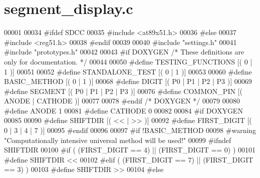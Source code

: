 \section{segment\_\-display.c}

\begin{DoxyCode}
00001 
00034 \textcolor{preprocessor}{#ifdef SDCC}
00035 \textcolor{preprocessor}{}\textcolor{preprocessor}{#include <at89x51.h>}
00036 \textcolor{preprocessor}{#else}
00037 \textcolor{preprocessor}{}\textcolor{preprocessor}{#include <reg51.h>}
00038 \textcolor{preprocessor}{#endif}
00039 \textcolor{preprocessor}{}
00040 \textcolor{preprocessor}{#include "settings.h"}
00041 \textcolor{preprocessor}{#include "prototypes.h"}
00042 
00043 \textcolor{preprocessor}{#if DOXYGEN }\textcolor{comment}{/* These definitions are only for documentation. */}
00044 
00050 \textcolor{preprocessor}{#define TESTING\_FUNCTIONS       [( 0 | 1 )]}
00051 \textcolor{preprocessor}{}
00052 \textcolor{preprocessor}{#define STANDALONE\_TEST         [( 0 | 1 )]}
00053 \textcolor{preprocessor}{}
00060 \textcolor{preprocessor}{#define BASIC\_METHOD            [( 0 | 1 )] }
00068 \textcolor{preprocessor}{#define DIGIT [( P0 | P1 | P2 | P3 )] }
00069 \textcolor{preprocessor}{#define SEGMENT [( P0 | P1 | P2 | P3 )] }
00076 \textcolor{preprocessor}{#define COMMON\_PIN [( ANODE | CATHODE )]}
00077 \textcolor{preprocessor}{}
00078 \textcolor{preprocessor}{#endif }\textcolor{comment}{/* DOXYGEN */}
00079 
00080 \textcolor{preprocessor}{#define ANODE 1}
00081 \textcolor{preprocessor}{}\textcolor{preprocessor}{#define CATHODE 0}
00082 \textcolor{preprocessor}{}
00084 \textcolor{preprocessor}{#if DOXYGEN}
00085 \textcolor{preprocessor}{}
00090 \textcolor{preprocessor}{#define SHIFTDIR [( << | >> )] }
00092 \textcolor{preprocessor}{#define FIRST\_DIGIT [( 0 | 3 | 4 | 7 )] }
00095 \textcolor{preprocessor}{#endif}
00096 \textcolor{preprocessor}{}
00097 \textcolor{preprocessor}{#if !BASIC\_METHOD}
00098 \textcolor{preprocessor}{}\textcolor{preprocessor}{#warning "Computationally intensive universal method will be used!"}
00099 \textcolor{preprocessor}{}\textcolor{preprocessor}{  #ifndef SHIFTDIR}
00100 \textcolor{preprocessor}{}\textcolor{preprocessor}{   #if ( (FIRST\_DIGIT == 4) || (FIRST\_DIGIT == 0) )}
00101 \textcolor{preprocessor}{}\textcolor{preprocessor}{   #define SHIFTDIR <<}
00102 \textcolor{preprocessor}{}\textcolor{preprocessor}{   #elif ( (FIRST\_DIGIT == 7) || (FIRST\_DIGIT == 3) )}
00103 \textcolor{preprocessor}{}\textcolor{preprocessor}{   #define SHIFTDIR >> }
00104 \textcolor{preprocessor}{}\textcolor{preprocessor}{   #else}

\end{DoxyCode}
